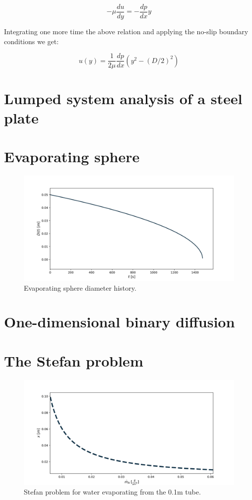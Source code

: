 \documentclass[10pt]{article}
\begin{document}
\begin{equation}
- \mu \frac{du}{dy} = - \frac{dp}{dx} y
\end{equation}

Integrating one more time the above relation and applying the no-slip boundary conditions we get:

\begin{equation}
u(y) = \frac{1}{2 \mu} \frac{dp}{dx} (y^2 - (D/2)^2)
\end{equation}


\newpage

\section{Lumped system analysis of a steel plate}



\newpage

\section{Evaporating sphere}

\begin{figure}[H]
\centering\includegraphics[width=16cm]{Code/evaporating-sphere.png}
\caption{Evaporating sphere diameter history.}
\label{fig:stefan-problem}
\end{figure}

\newpage

\section{One-dimensional binary diffusion}



\newpage

\section{The Stefan problem}

\begin{figure}[H]
\centering\includegraphics[width=16cm]{Code/stefan-problem.png}
\caption{Stefan problem for water evaporating from the 0.1m tube.}
\label{fig:stefan-problem}
\end{figure}
\end{document}
